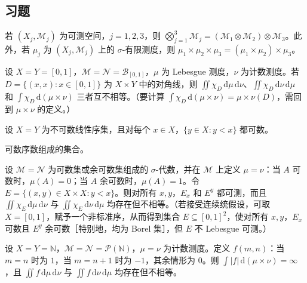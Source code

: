 \documentclass[../../main.tex]{subfiles}%
\begin{document}
\subsection*{习题}
\begin{exercise}\label{exercise:ch02-product-associativity}
若 $(X_j,\mathscr{M}_j)$ 为可测空间，$j=1,2,3$，则 $\bigotimes_{j=1}^3\mathscr{M}_j=(\mathscr{M}_1\otimes\mathscr{M}_2)\otimes\mathscr{M}_3$。此外，若 $\mu_j$ 为 $(X_j,\mathscr{M}_j)$ 上的 $\sigma$-有限测度，则 $\mu_1\times\mu_2\times\mu_3=(\mu_1\times\mu_2)\times\mu_3$。
\end{exercise}
\begin{exercise}\label{exercise:ch02-fubini-non-sigma-finite}
设 $X=Y=[0,1]$，$\mathscr{M}=\mathscr{N}=\mathscr{B}_{[0,1]}$，$\mu$ 为 Lebesgue 测度，$\nu$ 为计数测度。若 $D=\{(x,x):x\in[0,1]\}$ 为 $X\times Y$ 中的对角线，则 $\iint\chi_D\,\mathrm{d}\mu\,\mathrm{d}\nu$、$\iint\chi_D\,\mathrm{d}\nu\,\mathrm{d}\mu$ 和 $\int\chi_D\,\mathrm{d}(\mu\times\nu)$ 三者互不相等。（要计算 $\int\chi_D\,\mathrm{d}(\mu\times\nu)=\mu\times\nu(D)$，需回到 $\mu\times\nu$ 的定义。）
\end{exercise}
\begin{exercise}\label{exercise:ch02-nonmeasurable-separately-measurable}
设 $X=Y$ 为不可数线性序集，且对每个 $x\in X$，$\{y\in X:y<x\}$ 都可数。
\begin{example*}
可数序数组成的集合。
\end{example*}
设 $\mathscr{M}=\mathscr{N}$ 为可数集或余可数集组成的 $\sigma$-代数，并在 $\mathscr{M}$ 上定义 $\mu=\nu$：当 $A$ 可数时，$\mu(A)=0$；当 $A$ 余可数时，$\mu(A)=1$。令 $E=\{(x,y)\in X\times X:y<x\}$。则对所有 $x,y$，$E_x$ 和 $E^y$ 都可测，而且 $\iint\chi_E\,\mathrm{d}\mu\,\mathrm{d}\nu$ 与 $\iint\chi_E\,\mathrm{d}\nu\,\mathrm{d}\mu$ 均存在但不相等。（若接受连续统假设，可取 $X=[0,1]$，赋予一个非标准序，从而得到集合 $E\subseteq[0,1]^2$，使对所有 $x,y$，$E_x$ 可数且 $E^y$ 余可数［特别地，均为 Borel 集］，但 $E$ 不 Lebesgue 可测。）
\end{exercise}
\begin{exercise}\label{exercise:ch02-nonintegrable-iterated}
设 $X=Y=\mathbb{N}$，$\mathscr{M}=\mathscr{N}=\mathscr{P}(\mathbb{N})$，$\mu=\nu$ 为计数测度。定义 $f(m,n)$：当 $m=n$ 时为 $1$，当 $m=n+1$ 时为 $-1$，其余情形为 $0$。则 $\int|f|\,\mathrm{d}(\mu\times\nu)=\infty$，且 $\iint f\,\mathrm{d}\mu\,\mathrm{d}\nu$ 与 $\iint f\,\mathrm{d}\nu\,\mathrm{d}\mu$ 均存在但不相等。
\end{exercise}
\end{document}
